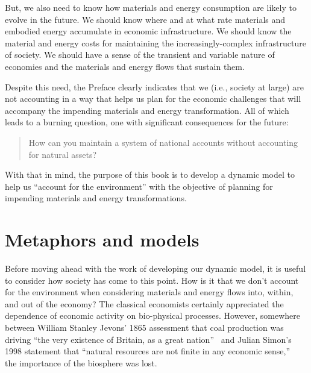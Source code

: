 But, we also need to know how materials and energy consumption 
are likely to evolve in the future.
We should know where and at what rate 
materials and embodied energy accumulate 
in economic infrastructure. 
We should know the material and energy costs for maintaining the
increasingly-complex infrastructure of society.
We should have a sense of the transient and variable nature of economies
and the materials and energy flows that sustain them.

Despite this need,
the Preface clearly indicates that we (i.e., society at large) 
are not accounting in a way that helps us plan 
for the economic challenges that will accompany 
the impending materials and energy transformation.
All of which leads to a burning question,
one with significant consequences for the future:

\begin{quote}
{\normalsize How can you maintain a system of national accounts without accounting for natural assets?}
\end{quote}

\noindent{}With that in mind, the purpose of this book is to 
develop a dynamic model to help us
``account for the environment''
with the objective of planning for impending materials and energy transformations.

\section{Metaphors and models}
\label{sec:metaphors_and_models}

Before moving ahead with the work of developing our dynamic model,
it is useful to consider how society has come to this point.
How is it that we don't account for the environment when 
considering materials and energy flows into, within, and out of the economy?
The classical economists certainly appreciated the dependence of
economic activity on bio-physical processes.\cite{Cleveland1987, Hall2011, Dale2012}
However, somewhere between William Stanley Jevons' 1865
assessment that
coal production was driving ``the very existence of Britain, as a great nation''~\cite[IV.3]{Jevons1865}
and Julian Simon's 1998 statement that
``natural resources are not finite in any economic sense,''~\cite[p.~54]{Simon1998} %
the importance of the biosphere was lost.


